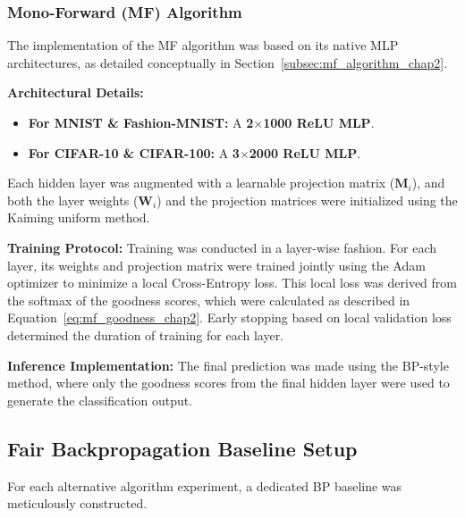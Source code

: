 \subsubsection{Mono-Forward (MF) Algorithm}
\label{subsec:methodology_mf}
The implementation of the MF algorithm was based on its native MLP architectures, as detailed conceptually in Section~\ref{subsec:mf_algorithm_chap2}.
\begin{itemize}
    \item \textbf{Architectural Details:}
        \begin{itemize}
            \item \textbf{For MNIST \& Fashion-MNIST:} A \textbf{2$\times$1000 ReLU MLP}.
            \item \textbf{For CIFAR-10 \& CIFAR-100:} A \textbf{3$\times$2000 ReLU MLP}.
        \end{itemize}
        Each hidden layer was augmented with a learnable projection matrix ($\mathbf{M}_i$), and both the layer weights ($\mathbf{W}_i$) and the projection matrices were initialized using the Kaiming uniform method.
    \item \textbf{Training Protocol:} Training was conducted in a layer-wise fashion. For each layer, its weights and projection matrix were trained jointly using the Adam optimizer to minimize a local Cross-Entropy loss. This local loss was derived from the softmax of the goodness scores, which were calculated as described in Equation~\ref{eq:mf_goodness_chap2}. Early stopping based on local validation loss determined the duration of training for each layer.
{\sloppy
\item \textbf{Inference Implementation:} The final prediction was made using the BP-style method, where only the goodness scores from the final hidden layer were used to generate the classification output.
\par}
\end{itemize}

\subsection{Fair Backpropagation Baseline Setup}
\label{sec:methodology_bp_baseline}
For each alternative algorithm experiment, a dedicated BP baseline was meticulously constructed.

